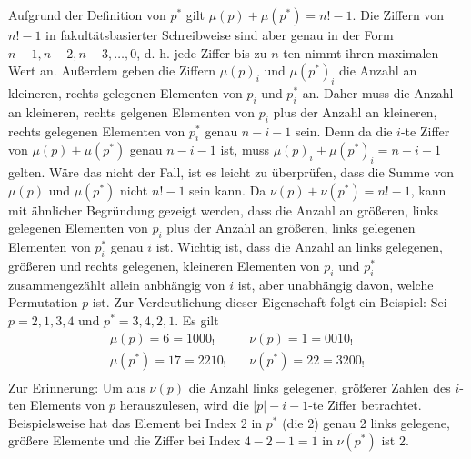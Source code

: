 \documentclass[a4paper, 11pt, ngerman]{article}
\begin{document}
Aufgrund der Definition von $p^*$ gilt $\mu(p) + \mu(p^*) = n! - 1$. Die Ziffern von $n! - 1$ in fakultätsbasierter Schreibweise sind aber genau in der Form $n-1, n-2, n-3, \dots, 0$, d. h. jede Ziffer bis zu $n$-ten nimmt ihren maximalen Wert an. Außerdem geben die Ziffern $\mu(p)_i$ und $\mu(p^*)_{i}$ die Anzahl an kleineren, rechts gelegenen Elementen von $p_i$ und $p^*_i$ an. Daher muss die Anzahl an kleineren, rechts gelgenen Elementen von $p_i$ plus der Anzahl an kleineren, rechts gelegenen Elementen von $p^*_i$ genau $n-i-1$ sein. Denn da die $i$-te Ziffer von $\mu(p) + \mu(p^*)$ genau $n - i - 1$ ist, muss $\mu(p)_i + \mu(p^*)_{i} = n-i-1$ gelten. Wäre das nicht der Fall, ist es leicht zu überprüfen, dass die Summe von $\mu(p)$ und $\mu(p^*)$ nicht $n! - 1$ sein kann. Da $\nu(p) + \nu(p^*) = n! - 1$, kann mit ähnlicher Begründung gezeigt werden, dass die Anzahl an größeren, links gelegenen Elementen von $p_i$ plus der Anzahl an größeren, links gelegenen Elementen von $p^*_i$ genau $i$ ist. Wichtig ist, dass die Anzahl an links gelegenen, größeren und rechts gelegenen, kleineren Elementen von $p_i$ und $p^*_i$ zusammengezählt allein anbhängig von $i$ ist, aber unabhängig davon, welche Permutation $p$ ist. Zur Verdeutlichung dieser Eigenschaft folgt ein Beispiel: Sei $p = 2,1,3,4$ und $p^* = 3,4,2,1$. Es gilt
\begin{align*}
    \mu(p)    = 6 =  1000_! \quad  & \nu(p)     = 1 = 0010_! \\
    \mu(p^*) = 17 =  2210_!  \quad & \nu(p^*) = 22 = 3200_!  \\
\end{align*}
Zur Erinnerung: Um aus $\nu(p)$ die Anzahl links gelegener, größerer Zahlen des $i$-ten Elements von $p$ herauszulesen, wird die $|p| - i - 1$-te Ziffer betrachtet. Beispielsweise hat das Element bei Index 2 in $p^*$ (die 2) genau 2 links gelegene, größere Elemente und die Ziffer bei Index $4 - 2 - 1 = 1$ in $\nu(p^*)$ ist 2.
\end{document}
